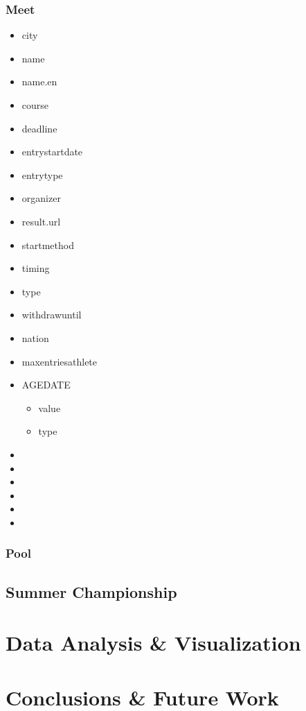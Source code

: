 \documentclass[a4paper, 11pt]{article}
\begin{document}
\subsubsection*{Meet}

\begin{itemize}
    \item city
    \item name
    \item name.en
    \item course
    \item deadline
    \item entrystartdate
    \item entrytype
    \item organizer
    \item result.url
    \item startmethod
    \item timing
    \item type
    \item withdrawuntil
    \item nation
    \item maxentriesathlete
    \item AGEDATE
    \begin{itemize}
        \item value
        \item type
    \end{itemize}
    \item 
    \item 
    \item 
    \item 
    \item 
    \item 
    
\end{itemize}

\subsubsection*{Pool}


\subsection{Summer Championship}

\pagebreak

\section{Data Analysis \& Visualization} \label{sec:analysis}

\pagebreak

\section{Conclusions \& Future Work} \label{sec:conclusion}
\end{document}
